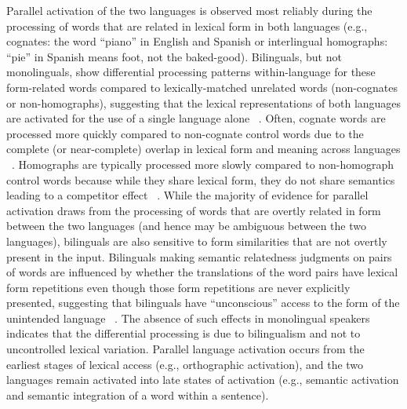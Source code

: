 Parallel activation of the two languages is observed most reliably during the processing of words that are related in lexical form in both languages (e.g., cognates: the word ``piano'' in English and Spanish or interlingual homographs: ``pie'' in Spanish means foot, not the baked-good). Bilinguals, but not monolinguals, show differential processing patterns within-language for these form-related words compared to lexically-matched unrelated words (non-cognates or non-homographs), suggesting that the lexical representations of both languages are activated for the use of a single language alone ~\citep[e.g.,][]{Dijkstra2005}. Often, cognate words are processed more quickly compared to non-cognate control words due to the complete (or near-complete) overlap in lexical form and meaning across languages ~\citep[e.g.,][]{Schwartz2007, VanHell2002}. Homographs are typically processed more slowly compared to non-homograph control words because while they share lexical form, they do not share semantics leading to a competitor effect ~\citep[e.g.,][]{Dijkstra1998}. While the majority of evidence for parallel activation draws from the processing of words that are overtly related in form between the two languages (and hence may be ambiguous between the two languages), bilinguals are also sensitive to form similarities that are not overtly present in the input. Bilinguals making semantic relatedness judgments on pairs of words are influenced by whether the translations of the word pairs have lexical form repetitions even though those form repetitions are never explicitly presented, suggesting that bilinguals have ``unconscious'' access to the form of the unintended language ~\citep{Thierry2007, Wu2010, Morford2014}. The absence of such effects in monolingual speakers indicates that the differential processing is due to bilingualism and not to uncontrolled lexical variation. Parallel language activation occurs from the earliest stages of lexical access (e.g., orthographic activation), and the two languages remain activated into late states of activation (e.g., semantic activation and semantic integration of a word within a sentence). 

